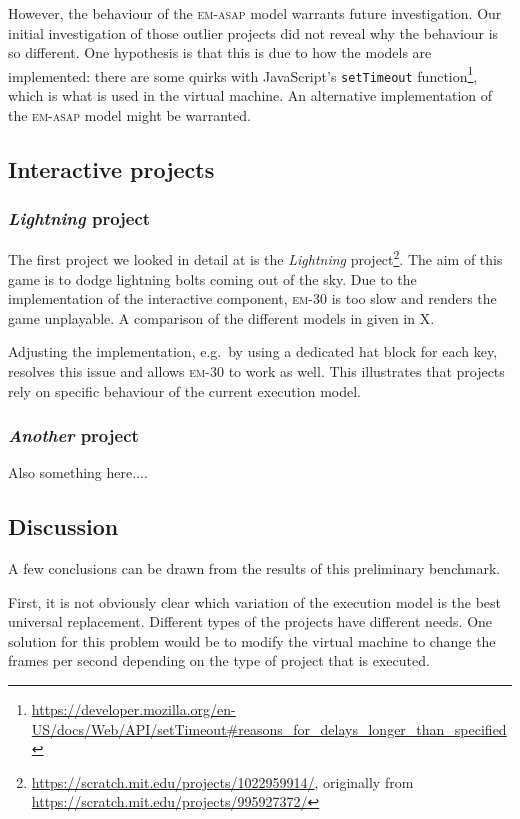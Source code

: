 \documentclass[../main]{subfiles}
\begin{document}
However, the behaviour of the \textsc{em-asap} model warrants future investigation.
Our initial investigation of those outlier projects did not reveal why the behaviour is so different.
One hypothesis is that this is due to how the models are implemented: there are some quirks with JavaScript's \texttt{setTimeout} function\footnote{\url{https://developer.mozilla.org/en-US/docs/Web/API/setTimeout#reasons_for_delays_longer_than_specified}}, which is what is used in the virtual machine.
An alternative implementation of the \textsc{em-asap} model might be warranted.

\subsection{Interactive projects}\label{subsec:interactive-projects}

\subsubsection{\textit{Lightning} project}

The first project we looked in detail at is the \textit{Lightning} project\footnote{\url{https://scratch.mit.edu/projects/1022959914/}, originally from \url{https://scratch.mit.edu/projects/995927372/}}.
The aim of this game is to dodge lightning bolts coming out of the sky.
Due to the implementation of the interactive component, \textsc{em-30} is too slow and renders the game unplayable.
A comparison of the different models in given in X.

Adjusting the implementation, e.g.\ by using a dedicated hat block for each key, resolves this issue and allows \textsc{em-30} to work as well.
This illustrates that projects rely on specific behaviour of the current execution model.

\subsubsection{\textit{Another} project}

Also something here....

\subsection{Discussion}\label{subsec:discussion}

A few conclusions can be drawn from the results of this preliminary benchmark.

First, it is not obviously clear which variation of the execution model is the best universal replacement.
Different types of the projects have different needs.
One solution for this problem would be to modify the virtual machine to change the frames per second depending on the type of project that is executed.
\end{document}
